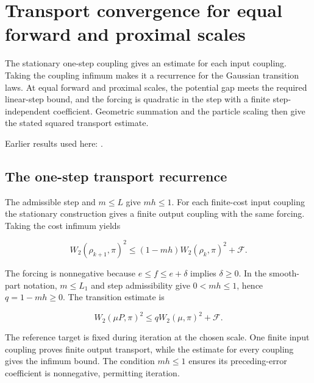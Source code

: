 \documentclass[11pt,a4paper]{report}
\begin{document}
\section{\texorpdfstring{Transport convergence for equal forward and proximal scales}{Transport convergence for equal forward and proximal scales}}
\label{proof-module-ProximalLangevin-SplittingEndpoint-lean}


The stationary one-step coupling gives an estimate for each input coupling. Taking the coupling infimum makes it a recurrence for the Gaussian transition laws. At equal forward and proximal scales, the potential gap meets the required linear-step bound, and the forcing is quadratic in the step with a finite step-independent coefficient. Geometric summation and the particle scaling then give the stated squared transport estimate.




Earlier results used here: \cite[Section~3.15]{LangevinLean2026ULASC}.
\subsection{\texorpdfstring{The one-step transport recurrence}{The one-step transport recurrence}}
\label{report-step-ProximalLangevin-SplittingEndpoint-lean-1}


The admissible step and \(m\le L\) give \(mh\le1\). For each finite-cost input coupling the stationary construction gives a finite output coupling with the same forcing. Taking the cost infimum yields

\[W_2(\rho_{k+1},\pi)^2\le(1-mh)W_2(\rho_k,\pi)^2+\mathcal F.\]

The forcing is nonnegative because \(e\le f\le e+\delta\) implies \(\delta\ge0\). In the smooth-part notation, \(m\le L_1\) and step admissibility give \(0<mh\le1\), hence \(q=1-mh\ge0\). The transition estimate is

\[W_2(\mu P,\pi)^2\le qW_2(\mu,\pi)^2+\mathcal F.\]

The reference target is fixed during iteration at the chosen scale. One finite input coupling proves finite output transport, while the estimate for every coupling gives the infimum bound. The condition \(mh\le1\) ensures its preceding-error coefficient is nonnegative, permitting iteration.
\end{document}
